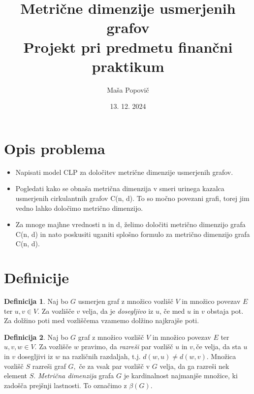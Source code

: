 \documentclass[a4paper,12pt]{article}
\title{
  Metrične dimenzije usmerjenih grafov \\
  \large Projekt pri predmetu finančni praktikum\\}
\author{Maša Popovič}
\date{\small 13. 12. 2024}
\theoremstyle{definition}
\newtheorem{definicija}{Definicija}[section]
\theoremstyle{remark}
\theoremstyle{definition}
\begin{document}
\maketitle

\section*{Opis problema}

\begin{itemize}
    \item Napisati model CLP za določitev metrične dimenzije usmerjenih grafov.
    \item Pogledati kako se obnaša metrična dimenzija v smeri urinega kazalca usmerjenih cirkulantnih grafov C(n, d). To so močno povezani grafi, torej jim vedno lahko določimo metrično dimenzijo.
    \item Za mnoge majhne vrednosti n in d, želimo določiti metrično dimenzijo grafa C(n, d) in nato poskusiti uganiti splošno formulo za metrično dimenzijo grafa C(n, d).
\end{itemize}
 
\section*{Definicije}

\begin{definicija}
    Naj bo $G$ usmerjen graf z množico vozlišč $V$ in 
    množico povezav $E$ ter $u,v \in V.$ Za vozlišče $v$ velja, da je \textit{dosegljivo}
    iz $u$, če med $u$ in $v$ obstaja pot. Za dolžino poti med vozliščema vzamemo dolžino
    najkrajše poti.
    \\
\end{definicija}

\par

\begin{definicija}
    Naj bo $G$ graf z množico vozlišč $V$ in množico povezav $E$ ter $u,v,w \in V.$ Za vozlišče 
    $w$ pravimo, da \textit{razreši} par vozlišč $u$ in $v,$če velja, da sta $u$ in $v$ dosegljivi
    iz $w$ na različnih razdaljah, t.j. $d(w,u) \neq d(w,v).$ Množica vozlišč $S$ razreši graf $G,$ če 
    za vsak par vozlišč v $G$ velja, da ga razreši nek element $S.$ \textit{Metrična dimenzija} grafa $G$
    je kardinalnost najmanjše množice, ki zadošča prejšnji lastnosti. To označimo z $\beta(G).$
    \\
\end{definicija}
\end{document}
